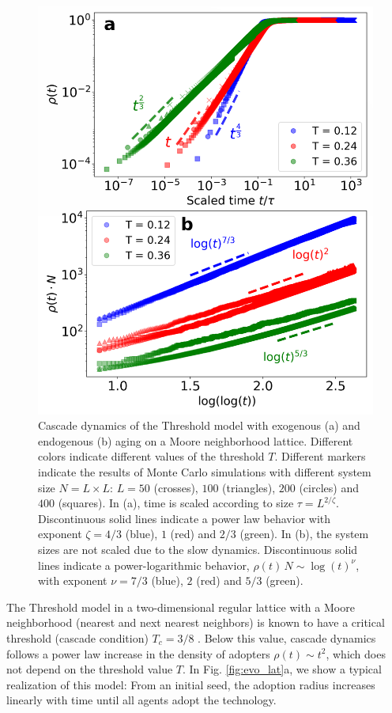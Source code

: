 \begin{figure}
\includegraphics[width=\columnwidth]{Figs/Aging_Threshold/FIG_EVO.png}
\caption[Cascade dynamics snapshots in a lattice]{\label{fig:lattice} Cascade dynamics of the Threshold model with exogenous (a) and endogenous (b) aging on a Moore neighborhood lattice. Different colors indicate different values of the threshold $T$. Different markers indicate the results of Monte Carlo simulations with different system size $N = L \times L$:  $L = 50$ (crosses), $100$ (triangles), $200$ (circles) and $400$ (squares). In (a), time is scaled according to size $\tau = L^{2 / \zeta}$. Discontinuous solid lines indicate a power law behavior with exponent $ \zeta = 4/3$ (blue), $1$ (red) and $2/3$ (green). In (b), the system sizes are not scaled due to the slow dynamics. Discontinuous solid lines indicate a power-logarithmic behavior, $\rho(t) \, N \sim \log(t)^{\nu} $, with exponent $ \nu = 7/3$ (blue), $2$ (red) and $5/3$ (green).}
\end{figure}

The Threshold model in a two-dimensional regular lattice with a Moore neighborhood (nearest and next nearest neighbors) is known to have a critical threshold (cascade condition) $T_c = 3/8$ \cite{centola-2007}. Below this value, cascade dynamics follows a power law increase in the density of adopters $\rho(t) \sim t^2$, which does not depend on the threshold value $T$. In Fig. \ref{fig:evo_lat}a, we show a typical realization of this model: From an initial seed, the adoption radius increases linearly with time until all agents adopt the technology.

